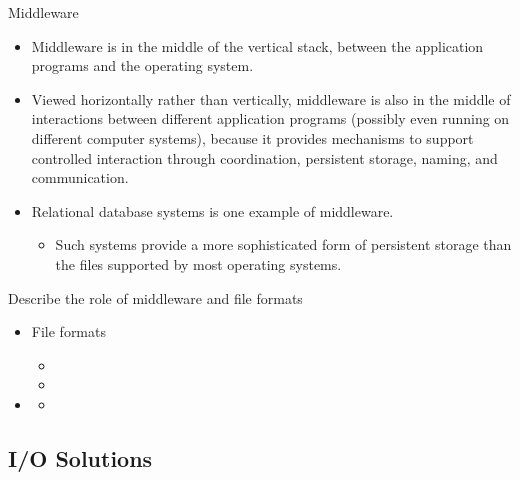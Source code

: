 \documentclass[compress,11pt,xcolor=svgnames,aspectratio=169]{beamer}
\begin{document}
\begin{frame}[t]{Middleware}

\begin{itemize}
\setlength\itemsep{0.4cm}

  \item Middleware is in the middle of the vertical stack, between the application programs and the operating system.

  \item Viewed horizontally rather than vertically, middleware is also in the middle of interactions between different application programs (possibly even running on different computer systems), because it provides mechanisms to support controlled interaction through coordination, persistent storage, naming, and communication.

  \item Relational database systems is one example of middleware.

  \begin{itemize}
    \item Such systems provide a more sophisticated form of persistent storage than the files supported by most operating systems.
  \end{itemize}

\end{itemize}

\end{frame}

\begin{frame}[t]{Describe the role of middleware and file formats}

\begin{itemize}

  \item File formats
    \begin{itemize}
        \item
        \item
    \end{itemize}

  \item
    \begin{itemize}
      \item
    \end{itemize}

\end{itemize}

\end{frame}

\subsection{I/O Solutions}
\end{document}
